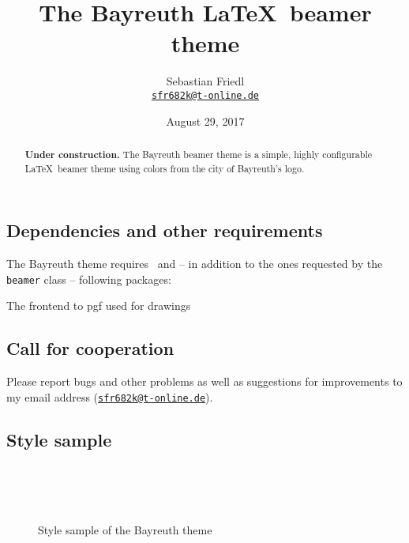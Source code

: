 \documentclass[11pt]{ltxdoc}
\title{The Bayreuth \LaTeX\ beamer theme}
\author{Sebastian Friedl \\ \href{mailto:sfr682k@t-online.de}{\texttt{sfr682k@t-online.de}}}
\date{August 29, 2017}
\begin{document}
	\maketitle
	\thispagestyle{empty}
	
	\medskip
	\begin{abstract}
		\hspace{-1.5em}%
		\textbf{Under construction.}
		The Bayreuth beamer theme is a simple, highly configurable \LaTeX\ beamer theme using colors from the city of Bayreuth's logo.
	\end{abstract}
	

	\tableofcontents

	\clearpage

	
	
	\subsection*{Dependencies and other requirements}
	The Bayreuth theme requires \LaTeXe\ and -- in addition to the ones requested by the \texttt{beamer} class -- following packages:
	
	\medskip
	The frontend to pgf used for drawings

	
	
	\subsection*{Call for cooperation}
	Please report bugs and other problems as well as suggestions for improvements to my email address (\href{mailto:sfr682k@t-online.de}{\texttt{sfr682k@t-online.de}}).
	
	
	\subsection*{Style sample}
	\begin{figure} \centering
		~~~ \\[.5em]
		~~~ \\[.5em]
		~~~ \\[.5em]
		
		\caption{Style sample of the Bayreuth theme}
		\label{stylesample}
	\end{figure}
	
\end{document}
